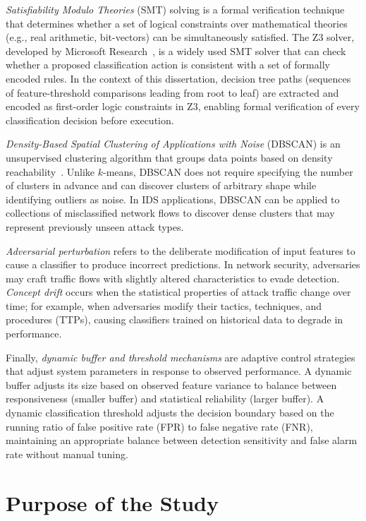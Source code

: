 \documentclass[12pt, letterpaper, oneside]{report}
\begin{document}
\emph{Satisfiability Modulo Theories} (SMT) solving is a formal verification technique that determines whether a set of logical constraints over mathematical theories (e.g., real arithmetic, bit-vectors) can be simultaneously satisfied. The Z3 solver, developed by Microsoft Research~\cite{demoura2008}, is a widely used SMT solver that can check whether a proposed classification action is consistent with a set of formally encoded rules. In the context of this dissertation, decision tree paths (sequences of feature-threshold comparisons leading from root to leaf) are extracted and encoded as first-order logic constraints in Z3, enabling formal verification of every classification decision before execution.

\emph{Density-Based Spatial Clustering of Applications with Noise} (DBSCAN) is an unsupervised clustering algorithm that groups data points based on density reachability~\cite{ester1996}. Unlike $k$-means, DBSCAN does not require specifying the number of clusters in advance and can discover clusters of arbitrary shape while identifying outliers as noise. In IDS applications, DBSCAN can be applied to collections of misclassified network flows to discover dense clusters that may represent previously unseen attack types.

\emph{Adversarial perturbation} refers to the deliberate modification of input features to cause a classifier to produce incorrect predictions. In network security, adversaries may craft traffic flows with slightly altered characteristics to evade detection. \emph{Concept drift} occurs when the statistical properties of attack traffic change over time; for example, when adversaries modify their tactics, techniques, and procedures (TTPs), causing classifiers trained on historical data to degrade in performance.

Finally, \emph{dynamic buffer and threshold mechanisms} are adaptive control strategies that adjust system parameters in response to observed performance. A dynamic buffer adjusts its size based on observed feature variance to balance between responsiveness (smaller buffer) and statistical reliability (larger buffer). A dynamic classification threshold adjusts the decision boundary based on the running ratio of false positive rate (FPR) to false negative rate (FNR), maintaining an appropriate balance between detection sensitivity and false alarm rate without manual tuning.


\section{Purpose of the Study}
\label{sec:purpose}
\end{document}
